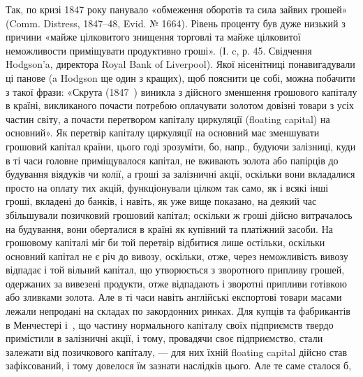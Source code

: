 Так, по кризі 1847 року панувало «обмеження оборотів та сила зайвих
грошей» (Comm. Distress, 1847--48, Evid. № 1664). Рівень проценту був дуже
низький з причини «майже цілковитого знищення торговлі та майже цілковитої
неможливости приміщувати продуктивно гроші». (І. c, р. 45. Свідчення Hodgson’a,
директора Royal Bank of Liverpool). Якої нісенітниці понавигадували ці панове
(a Hodgson ще один з кращих), щоб пояснити це собі, можна побачити з такої
фрази: «Скрута (1847~) виникла з дійсного зменшення грошового капіталу
в країні, викликаного почасти потребою оплачувати золотом довізні товари
з усіх частин світу, а почасти перетвором капіталу циркуляції (floating capital)
на основний». Як перетвір капіталу циркуляції на основний має зменшувати
грошовий капітал країни, цього годі зрозуміти, бо, напр., будуючи залізниці,
куди в ті часи головне приміщувалося капітал, не вживають золота або папірців
до будування віядуків чи колії, а гроші за залізничні акції, оскільки вони
вкладалися просто на оплату тих акцій, функціонували цілком так само, як
і всякі інші гроші, вкладені до банків, і навіть, як уже вище показано, на
деякий час збільшували позичковий грошовий капітал; оскільки ж гроші дійсно
витрачалось на будування, вони оберталися в країні як купівний та платіжний
засоби. На грошовому капіталі міг би той перетвір відбитися лише остільки,
оскільки основний капітал не є річ до вивозу, оскільки, отже, через неможливість
вивозу відпадає і той вільний капітал, що утворюється з зворотного припливу грошей,
одержаних за вивезені продукти, отже відпадають і зворотні припливи готівкою
або зливками золота. Але в ті часи навіть англійські експортові товари масами
лежали непродані на складах по закордонних ринках. Для купців та фабрикантів
в Менчестері і~, що частину нормального капіталу своїх підприємств твердо
примістили в залізничні акції, і тому, провадячи своє підприємство, стали
залежати від позичкового капіталу, — для них їхній floating capital дійсно став
зафіксований, і тому довелося їм зазнати наслідків цього. Але те саме сталося б,
\parbreak{}  %
